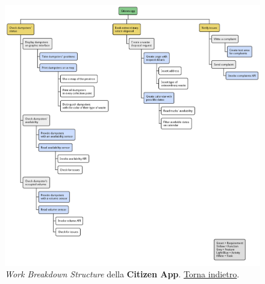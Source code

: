 \begin{figure}[H]
    \centering
    \includegraphics[width=\textwidth]{uml/wbs-citizen-app.pm}
    \caption{\textit{Work Breakdown Structure} della \textbf{Citizen App}. \hyperlink{back:uml/wbs-citizen-app}{Torna indietro}.}
    \label{fig:uml/wbs-citizen-app}
\end{figure}

